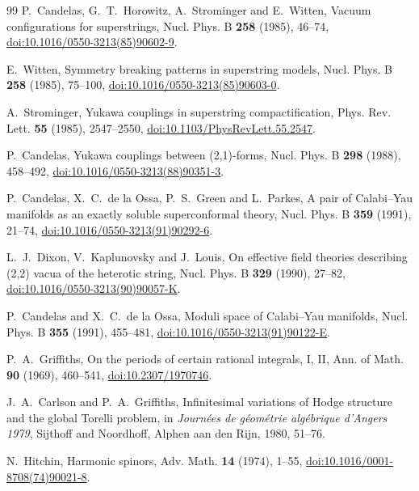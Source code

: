 \begin{thebibliography}{99}
P.~Candelas, G.~T.~Horowitz, A.~Strominger and E.~Witten, Vacuum
configurations for superstrings, Nucl. Phys. B \textbf{258} (1985), 46--74,
\href{https://doi.org/10.1016/0550-3213(85)90602-9}{doi:10.1016/0550-3213(85)90602-9}.

E.~Witten, Symmetry breaking patterns in superstring models, Nucl. Phys. B
\textbf{258} (1985), 75--100,
\href{https://doi.org/10.1016/0550-3213(85)90603-0}{doi:10.1016/0550-3213(85)90603-0}.

A.~Strominger, Yukawa couplings in superstring compactification, Phys. Rev.
Lett. \textbf{55} (1985), 2547--2550,
\href{https://doi.org/10.1103/PhysRevLett.55.2547}{doi:10.1103/PhysRevLett.55.2547}.

P.~Candelas, Yukawa couplings between (2,1)-forms, Nucl. Phys. B
\textbf{298} (1988), 458--492,
\href{https://doi.org/10.1016/0550-3213(88)90351-3}{doi:10.1016/0550-3213(88)90351-3}.

P.~Candelas, X.~C.~de la Ossa, P.~S.~Green and L.~Parkes, A pair of
Calabi--Yau manifolds as an exactly soluble superconformal theory, Nucl.
Phys. B \textbf{359} (1991), 21--74,
\href{https://doi.org/10.1016/0550-3213(91)90292-6}{doi:10.1016/0550-3213(91)90292-6}.

L.~J.~Dixon, V.~Kaplunovsky and J.~Louis, On effective field theories
describing (2,2) vacua of the heterotic string, Nucl. Phys. B \textbf{329}
(1990), 27--82,
\href{https://doi.org/10.1016/0550-3213(90)90057-K}{doi:10.1016/0550-3213(90)90057-K}.

P.~Candelas and X.~C.~de la Ossa, Moduli space of Calabi--Yau manifolds,
Nucl. Phys. B \textbf{355} (1991), 455--481,
\href{https://doi.org/10.1016/0550-3213(91)90122-E}{doi:10.1016/0550-3213(91)90122-E}.

P.~A.~Griffiths, On the periods of certain rational integrals, I, II, Ann.
of Math. \textbf{90} (1969), 460--541,
\href{https://doi.org/10.2307/1970746}{doi:10.2307/1970746}.

J.~A.~Carlson and P.~A.~Griffiths, Infinitesimal variations of Hodge
structure and the global Torelli problem, in \emph{Journ\'ees de
g\'eom\'etrie alg\'ebrique d'Angers 1979}, Sijthoff and Noordhoff, Alphen
aan den Rijn, 1980, 51--76.

N.~Hitchin, Harmonic spinors, Adv. Math. \textbf{14} (1974), 1--55,
\href{https://doi.org/10.1016/0001-8708(74)90021-8}{doi:10.1016/0001-8708(74)90021-8}.


\end{thebibliography}
